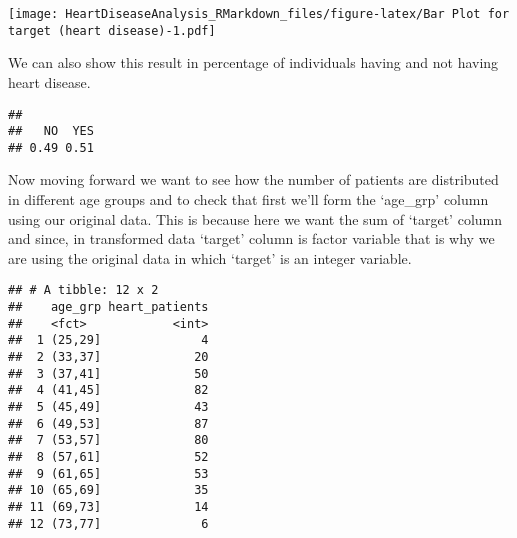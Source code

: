 \documentclass[
]{article}
\newenvironment{Shaded}{\begin{snugshade}}{\end{snugshade}}
\newcommand{\AttributeTok}[1]{\textcolor[rgb]{0.77,0.63,0.00}{#1}}
\newcommand{\CommentTok}[1]{\textcolor[rgb]{0.56,0.35,0.01}{\textit{#1}}}
\newcommand{\DecValTok}[1]{\textcolor[rgb]{0.00,0.00,0.81}{#1}}
\newcommand{\FunctionTok}[1]{\textcolor[rgb]{0.00,0.00,0.00}{#1}}
\newcommand{\NormalTok}[1]{#1}
\newcommand{\OtherTok}[1]{\textcolor[rgb]{0.56,0.35,0.01}{#1}}
\newcommand{\SpecialCharTok}[1]{\textcolor[rgb]{0.00,0.00,0.00}{#1}}
\begin{document}
\texttt{[image: HeartDiseaseAnalysis\_RMarkdown\_files/figure-latex/Bar Plot for target (heart disease)-1.pdf]}

We can also show this result in percentage of individuals having and not
having heart disease.

\begin{Shaded}
\end{Shaded}

\begin{verbatim}
## 
##   NO  YES 
## 0.49 0.51
\end{verbatim}

Now moving forward we want to see how the number of patients are
distributed in different age groups and to check that first we'll form
the `age\_grp' column using our original data. This is because here we
want the sum of `target' column and since, in transformed data `target'
column is factor variable that is why we are using the original data in
which `target' is an integer variable.

\begin{Shaded}
\end{Shaded}

\begin{verbatim}
## # A tibble: 12 x 2
##    age_grp heart_patients
##    <fct>            <int>
##  1 (25,29]              4
##  2 (33,37]             20
##  3 (37,41]             50
##  4 (41,45]             82
##  5 (45,49]             43
##  6 (49,53]             87
##  7 (53,57]             80
##  8 (57,61]             52
##  9 (61,65]             53
## 10 (65,69]             35
## 11 (69,73]             14
## 12 (73,77]              6
\end{verbatim}
\end{document}

